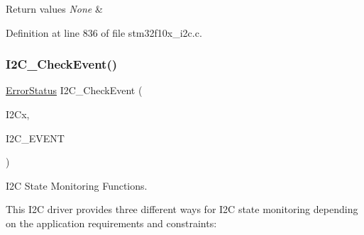 \begin{DoxyRetVals}{Return values}
{\em None} & \\
\hline
\end{DoxyRetVals}


Definition at line 836 of file stm32f10x\+\_\+i2c.\+c.

\mbox{\label{group___i2_c___exported___functions_ga2d5701342f9d4c1f09bf9d3cdcacc326}} 
\subsubsection{\texorpdfstring{I2\+C\+\_\+\+Check\+Event()}{I2C\_CheckEvent()}}
{\footnotesize\ttfamily \hyperlink{group___exported__types_ga8333b96c67f83cba354b3407fcbb6ee8}{Error\+Status} I2\+C\+\_\+\+Check\+Event (\begin{DoxyParamCaption}\item[{\hyperlink{struct_i2_c___type_def}{I2\+C\+\_\+\+Type\+Def} $\ast$}]{I2\+Cx,  }\item[{uint32\+\_\+t}]{I2\+C\+\_\+\+E\+V\+E\+NT }\end{DoxyParamCaption})}



I2C State Monitoring Functions. 

This I2C driver provides three different ways for I2C state monitoring depending on the application requirements and constraints\+:


